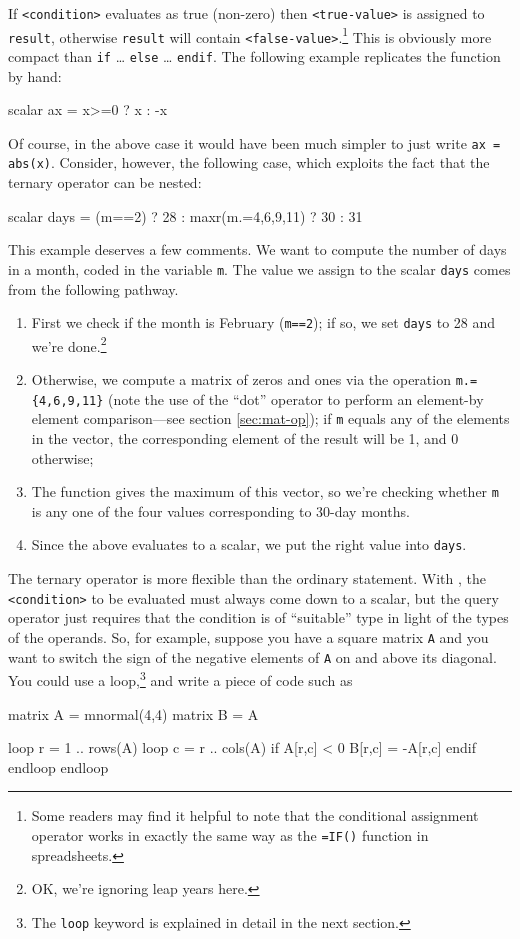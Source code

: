 If \texttt{<condition>} evaluates as true (non-zero) then
\texttt{<true-value>} is assigned to \texttt{result}, otherwise
\texttt{result} will contain \texttt{<false-value>}.\footnote{Some
  readers may find it helpful to note that the conditional assignment
  operator works in exactly the same way as the \texttt{=IF()} function
  in spreadsheets.}  This is obviously more compact than \texttt{if}
\dots{} \texttt{else} \dots{} \texttt{endif}. The following example
replicates the  function by hand:
\begin{code}
scalar ax = x>=0 ? x : -x
\end{code}
Of course, in the above case it would have been much simpler to just
write \texttt{ax = abs(x)}. Consider, however, the following case,
which exploits the fact that the ternary operator can be nested:
\begin{code}
scalar days = (m==2) ? 28 : maxr(m.={4,6,9,11}) ? 30 : 31
\end{code}
This example deserves a few comments. We want to compute the number of
days in a month, coded in the variable \texttt{m}. The value we assign
to the scalar \texttt{days} comes from the following pathway.
\begin{enumerate}
\item First we check if the month is February (\texttt{m==2}); if so,
  we set \texttt{days} to 28 and we're done.\footnote{OK, we're ignoring
    leap years here.}
\item Otherwise, we compute a matrix of zeros and ones via the
  operation \verb|m.={4,6,9,11}| (note the use of the ``dot'' operator
  to perform an element-by element comparison---see section
  \ref{sec:mat-op}); if \texttt{m} equals any of the elements in the
  vector, the corresponding element of the result will be 1, and 0
  otherwise;
\item The  function gives the maximum of this vector, so
  we're checking whether \texttt{m} is any one of the four values
  corresponding to 30-day months.
\item Since the above evaluates to a scalar, we put the right value
  into \texttt{days}.
\end{enumerate}

The ternary operator is more flexible than the ordinary 
statement. With , the \texttt{<condition>} to be evaluated
must always come down to a scalar, but the query operator just
requires that the condition is of ``suitable'' type in light of the
types of the operands.  So, for example, suppose you have a square
matrix \texttt{A} and you want to switch the sign of the negative
elements of \texttt{A} on and above its diagonal. You could use a
loop,\footnote{The \texttt{loop} keyword is explained in detail in the
  next section.} and write a piece of code such as
\begin{code}
matrix A = mnormal(4,4)
matrix B = A

loop r = 1 .. rows(A)
  loop c = r .. cols(A)
     if A[r,c] < 0
       B[r,c] = -A[r,c]
     endif
  endloop
endloop
\end{code}

